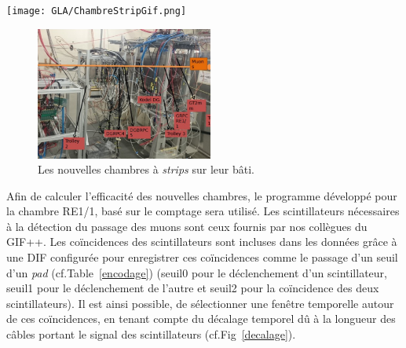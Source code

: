 \marginpar
{
	\centering
	\texttt{[image: GLA/ChambreStripGif.png]}
	\captionsetup{type=figure}\caption{Nouvelle chambre \SI{32}{\centi\meter}$\times$\SI{30}{\centi\meter}.}
	\label{nouvellestrip}
}
\vspace*{-0.2cm}
\begin{figure}[ht!]
	\centering
	\includegraphics[width=0.52\textwidth]{GLA/setup.png}
	\captionsetup{type=figure}\caption{Les nouvelles chambres à \textit{strips} sur leur bâti.}
	\label{bati}
\end{figure}
\vspace*{-0.2cm}
Afin de calculer l'efficacité des nouvelles chambres, le programme développé pour la chambre RE1/1, basé sur le comptage sera utilisé. Les scintillateurs nécessaires à la détection du passage des muons sont ceux fournis par nos collègues du GIF++. Les coïncidences des scintillateurs sont incluses dans les données grâce à une DIF configurée pour enregistrer ces coïncidences comme le passage d'un seuil d'un \textit{pad} (cf.Table~\ref{encodage}) (seuil0 pour le déclenchement d'un scintillateur, seuil1 pour le déclenchement de l'autre et seuil2 pour la coïncidence des deux scintillateurs). Il est ainsi possible, de sélectionner une fenêtre temporelle autour de ces coïncidences, en tenant compte du décalage temporel dû à la longueur des câbles portant le signal des scintillateurs (cf.Fig~\ref{decalage}). 

